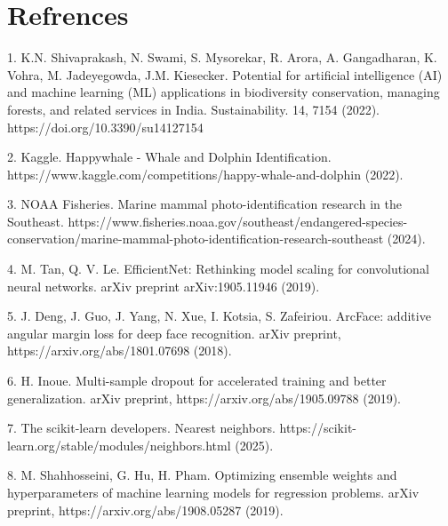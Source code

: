 \documentclass[twocolumn]{article}
\begin{document}
\section{Refrences}
1. K.N. Shivaprakash, N. Swami, S. Mysorekar, R. Arora, A. Gangadharan, K. Vohra, M. Jadeyegowda, J.M. Kiesecker. Potential for artificial intelligence (AI) and machine learning (ML) applications in biodiversity conservation, managing forests, and related services in India. Sustainability. 14, 7154 (2022). https://doi.org/10.3390/su14127154

2. Kaggle. Happywhale - Whale and Dolphin Identification. https://www.kaggle.com/competitions/happy-whale-and-dolphin (2022).

3. NOAA Fisheries. Marine mammal photo-identification research in the Southeast. https://www.fisheries.noaa.gov/southeast/endangered-species-conservation/marine-mammal-photo-identification-research-southeast (2024).

4. M. Tan, Q. V. Le. EfficientNet: Rethinking model scaling for convolutional neural networks. arXiv preprint arXiv:1905.11946 (2019).

5. J. Deng, J. Guo, J. Yang, N. Xue, I. Kotsia, S. Zafeiriou. ArcFace: additive angular margin loss for deep face recognition. arXiv preprint, https://arxiv.org/abs/1801.07698 (2018).

6. H. Inoue. Multi-sample dropout for accelerated training and better generalization. arXiv preprint, https://arxiv.org/abs/1905.09788 (2019).

7. The scikit-learn developers. Nearest neighbors. https://scikit-learn.org/stable/modules/neighbors.html (2025).

8. M. Shahhosseini, G. Hu, H. Pham. Optimizing ensemble weights and hyperparameters of machine learning models for regression problems. arXiv preprint, https://arxiv.org/abs/1908.05287 (2019).
\end{document}
